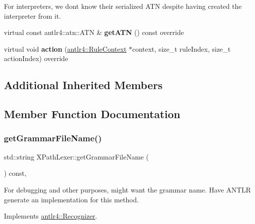 \begin{DoxyCompactItemize}
\begin{DoxyCompactList}
For interpreters, we don\textquotesingle{}t know their serialized A\+TN despite having created the interpreter from it. \end{DoxyCompactList}\item 
\mbox{\label{classXPathLexer_aa666e42449466c1524c3b2a02e2c1b7c}} 
virtual const antlr4\+::atn\+::\+A\+TN \& {\bfseries get\+A\+TN} () const override
\item 
\mbox{\label{classXPathLexer_ae56d96954dd9727bbebe547c56718c74}} 
virtual void {\bfseries action} (\hyperlink{classantlr4_1_1RuleContext}{antlr4\+::\+Rule\+Context} $\ast$context, size\+\_\+t rule\+Index, size\+\_\+t action\+Index) override
\end{DoxyCompactItemize}
\subsection*{Additional Inherited Members}


\subsection{Member Function Documentation}
\mbox{\label{classXPathLexer_aa212943fac87921b6793fda3b6dae10f}} 
\subsubsection{\texorpdfstring{get\+Grammar\+File\+Name()}{getGrammarFileName()}}
{\footnotesize\ttfamily std\+::string X\+Path\+Lexer\+::get\+Grammar\+File\+Name (\begin{DoxyParamCaption}{ }\end{DoxyParamCaption}) const\hspace{0.3cm}{\ttfamily [override]}, {\ttfamily [virtual]}}



For debugging and other purposes, might want the grammar name. Have A\+N\+T\+LR generate an implementation for this method. 



Implements \hyperlink{classantlr4_1_1Recognizer_a41d77f1ad38c68b4208d26c070fd2cc7}{antlr4\+::\+Recognizer}.

